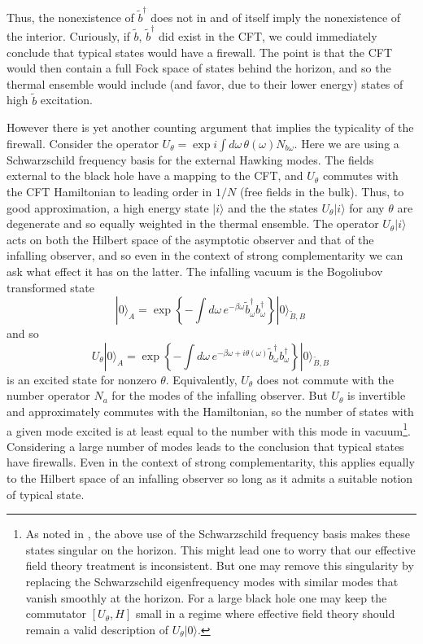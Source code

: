 \documentclass[12pt]{article}
\newcommand{\be}{\begin{equation}}
\newcommand{\ee}{\end{equation}}
\begin{document}
{{Thus, the nonexistence of $\tilde b^\dagger$ does not in and of itself imply the nonexistence of the interior.  Curiously, if
 $\tilde b$, $\tilde b^\dagger$ did exist in the CFT, we could immediately conclude that typical states would have a firewall.  The point is that the CFT would then contain a full Fock space of states behind the horizon, and so the thermal ensemble would include (and favor, due to their {lower} energy) states of high $\tilde b$ excitation.

However there is yet another counting argument that implies the typicality of the firewall.  Consider the operator $U_\theta = \exp i\int d\omega\,\theta(\omega) N_{b \omega}$.  Here we are using a Schwarzschild frequency basis for the external Hawking modes.  The fields external to the black hole have a mapping to the CFT, and $U_\theta$ commutes with the CFT Hamiltonian to leading order in $1/N$ (free fields in the bulk).  Thus, to good approximation, a high energy state $|i\rangle$ and the the states $U_\theta |i\rangle$ for any $\theta$ are degenerate and so equally weighted in the thermal ensemble.  The operator $U_\theta |i\rangle$ acts  on both the Hilbert space of the asymptotic observer and that of the infalling observer, and so even in the context of strong complementarity we can ask what effect it has on the latter.  The infalling vacuum
is the Bogoliubov transformed state
\be
|0\rangle_A = \exp \left\{ -\int d\omega \, e^{-\beta\omega} \tilde b_\omega^\dagger b^\dagger_\omega \right\}|0\rangle_{\tilde{B},B} \,
\ee
and so
\be
U_\theta |0\rangle_A = \exp \left\{ -\int d\omega \, e^{-\beta\omega + i \theta(\omega)} \tilde b_\omega^\dagger b^\dagger_\omega \right\}|0\rangle_{\tilde{B},B} \,
\ee
is an excited state for nonzero $\theta$.  Equivalently, $U_\theta$ does not commute with the number operator $N_a$ for the
modes of the infalling observer. But $U_\theta$ is invertible and approximately commutes with the Hamiltonian, so the number of states with a given mode excited is at least equal to the number with this mode in vacuum\footnote{{As noted in \cite{Maldacena:2013xja}, the above use of the Schwarzschild frequency basis makes these states singular on the horizon.  This might lead one to worry that our effective field theory treatment is inconsistent.   But one may remove this singularity by replacing the Schwarzschild eigenfrequency modes with similar modes that vanish smoothly at the horizon.  For a large black hole one may keep the commutator $[U_\theta, H]$ small in a regime where effective field theory should remain a valid description of $U_\theta |0\rangle$. }}.  Considering a large number of modes leads to the conclusion that typical states have firewalls.  Even in the context of strong complementarity, this  applies equally to the Hilbert space of an infalling observer  so long as it admits a suitable notion of typical state.


}}
\end{document}
